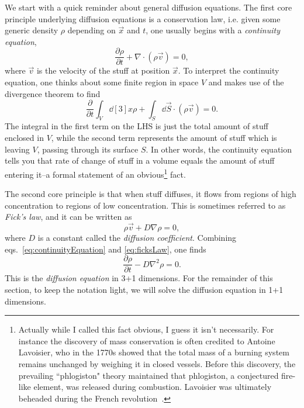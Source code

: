 We start with a quick reminder about general diffusion equations.
The first core
principle underlying diffusion equations is a conservation law, i.e.
given some generic density $\rho$ depending on $\vec{x}$ and $t$,
one usually begins with a {\it continuity equation},
\begin{equation}\label{eq:continuityEquation}
  \frac{\partial\rho}{\partial t}+\nabla\cdot\left(\rho\vec{v}\right)=0,
\end{equation}
where $\vec{v}$ is the velocity of the stuff at position $\vec{x}$. 
To interpret the continuity equation, one thinks about some finite region
in space $V$ and makes use of the divergence theorem to find
\begin{equation}
  \frac{\partial}{\partial t}\int_V \dd[3]{x}\rho
     +\int_{S}\dd{\vec{S}}\cdot\left(\rho\vec{v}\right)=0.
\end{equation}
The integral in the first term on the LHS is just the total amount of
stuff enclosed in $V$, while the second term represents the amount of
stuff which is leaving $V$, passing through its surface $S$. In other
words, the continuity equation tells you that rate of change of stuff
in a volume equals the amount of stuff entering it--a formal statement
of an obvious\footnote{Actually while I called this fact obvious,
I guess it isn't necessarily. For instance the discovery of mass conservation
is often credited to Antoine Lavoisier, who in the 1770s showed that 
the total mass of a burning system remains unchanged by weighing it
in closed vessels. Before this discovery, the prevailing ``phlogiston"
theory maintained that phlogiston, a conjectured fire-like element,
was released during combustion. Lavoisier was ultimately beheaded
during the French revolution~\cite{wiki:phlogiston,wiki:laviosier}.} fact. 

The second core principle is that when stuff diffuses, it flows from regions
of high concentration to regions of low concentration. This is
sometimes referred to as {\it Fick's law}, and it
can be written as
\begin{equation}\label{eq:ficksLaw}
  \rho\vec{v}+D\nabla\rho=0,
\end{equation}
where $D$ is a constant called the {\it diffusion coefficient}. Combining
eqs.~\eqref{eq:continuityEquation} and \eqref{eq:ficksLaw}, one finds
\begin{equation}
  \frac{\partial\rho}{\partial t}-D\nabla^2\rho = 0.
\end{equation}
This is the {\it diffusion equation} in 3+1 dimensions. For the remainder
of this section, to keep the notation light, we will solve the diffusion
equation in 1+1 dimensions.

